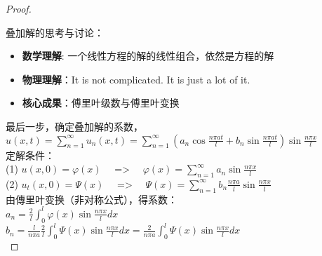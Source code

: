 \begin{example}
\begin{proof}
\begin{note}
叠加解的思考与讨论：
\begin{itemize}
\item \textbf {数学理解}: 一个线性方程的解的线性组合，依然是方程的解  
\item \textbf {物理理解}：It is not complicated. It is just a lot of it. 
\item \textbf {核心成果}：傅里叶级数与傅里叶变换 
\end{itemize}
\end{note}

最后一步，确定叠加解的系数，\\
$ \displaystyle u(x,t)=\sum_{n=1}^{\infty } u_n(x,t) = \sum_{n=1}^{\infty }  (a_n\cos\frac{ n\pi at}{l}+ b_n\sin \frac{ n\pi at}{l}) \sin \frac{ n\pi x}{l}$\\
定解条件：\\ 
(1) $ \displaystyle u(x,0)= \varphi (x)$ ~~=> ~~$\varphi (x)=\sum_{n=1}^{\infty } a_n \sin \frac{ n\pi x}{l}$\\  
(2) $ \displaystyle u_t(x,0)= \Psi (x)$ ~~=> ~~$\Psi (x)=\sum_{n=1}^{\infty } b_n \frac{ n\pi a}{l} \sin \frac{ n\pi x}{l}$ \\  \vspace{0.3cm}
由傳里叶变换（非对称公式），得系数：\\  
$ \displaystyle a_n=  \frac{2}{l}\int_{0 }^{l}  \varphi (x) \sin \frac{ n\pi x}{l} dx $\\   
$ \displaystyle b_n= \frac{l} { n\pi a} \frac{2}{l}\int_{0 }^{l}  \Psi  (x) \sin \frac{ n\pi x}{l} dx =  \frac{2} { n\pi a}  \int_{0 }^{l}  \Psi  (x) \sin \frac{ n\pi x}{l} dx$\\   
\end{proof}
\end{example}

